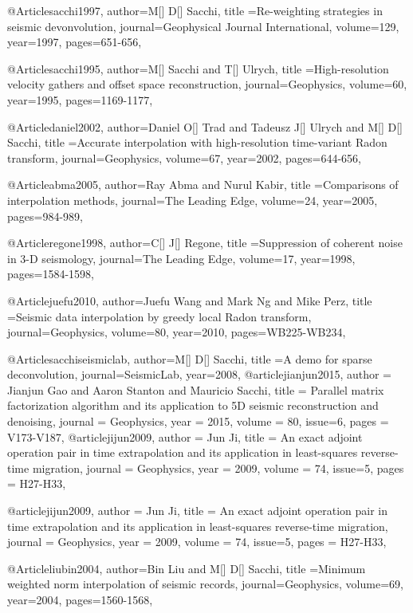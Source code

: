 @Article{sacchi1997,
  author={M[] D[] Sacchi},
  title ={Re-weighting strategies in seismic devonvolution},
  journal={Geophysical Journal International},
  volume=129,
  year=1997,
  pages={651-656},
}

@Article{sacchi1995,
  author={M[] Sacchi and T[] Ulrych},
  title ={High-resolution velocity gathers and offset space reconstruction},
  journal={Geophysics},
  volume=60,
  year=1995,
  pages={1169-1177},
}

@Article{daniel2002,
  author={Daniel O[] Trad and Tadeusz J[] Ulrych and M[] D[] Sacchi},
  title ={Accurate interpolation with high-resolution time-variant Radon transform},
  journal={Geophysics},
  volume=67,
  year=2002,
  pages={644-656},
}

@Article{abma2005,
  author={Ray Abma and Nurul Kabir},
  title ={Comparisons of interpolation methods},
  journal={The Leading Edge},
  volume=24,
  year=2005,
  pages={984-989},
}

@Article{regone1998,
  author={C[] J[] Regone},
  title ={Suppression of coherent noise in 3-{D} seismology},
  journal={The Leading Edge},
  volume=17,
  year=1998,
  pages={1584-1598},
}

@Article{juefu2010,
  author={Juefu Wang and Mark Ng and Mike Perz},
  title ={Seismic data interpolation by greedy local Radon transform},
  journal={Geophysics},
  volume=80,
  year=2010,
  pages={WB225-WB234},
}

@Article{sacchiseismiclab,
  author={M[] D[] Sacchi},
  title ={A demo for sparse deconvolution},
  journal={SeismicLab},
  year={2008},
}
@article{jianjun2015,
  author =	 {Jianjun Gao and Aaron Stanton and Mauricio Sacchi},
  title =	 {Parallel matrix factorization algorithm and its application to 5{D} seismic reconstruction and denoising},
  journal = 	 {Geophysics},
  year = 	 2015,
  volume =	 80,
    issue=6,
  pages =	 {V173-V187},
}
@article{jijun2009,
  author =	 {Jun Ji},
  title =	 {An exact adjoint operation pair in time extrapolation and its application in least-squares reverse-time migration},
  journal = 	 {Geophysics},
  year = 	 2009,
  volume =	 74,
    issue=5,
  pages =	 {H27-H33},
}

@article{jijun2009,
  author =	 {Jun Ji},
  title =	 {An exact adjoint operation pair in time extrapolation and its application in least-squares reverse-time migration},
  journal = 	 {Geophysics},
  year = 	 2009,
  volume =	 74,
    issue=5,
  pages =	 {H27-H33},
}

@Article{liubin2004,
  author={Bin Liu and M[] D[] Sacchi},
  title ={Minimum weighted norm interpolation of seismic records},
  journal={Geophysics},
  volume=69,
  year=2004,
  pages={1560-1568},
}

